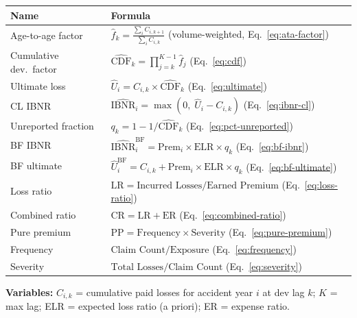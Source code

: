 \begin{tabularx}{\textwidth}{lX}
\toprule
\textbf{Name} & \textbf{Formula} \\
\midrule
Age-to-age factor &
$\displaystyle \hat{f}_k = \frac{\sum_{i} C_{i,k+1}}{\sum_{i} C_{i,k}}$
\quad (volume-weighted, Eq.~\ref{eq:ata-factor}) \\[12pt]

Cumulative dev.\ factor &
$\displaystyle \widehat{\text{CDF}}_k = \prod_{j=k}^{K-1} \hat{f}_j$
\quad (Eq.~\ref{eq:cdf}) \\[12pt]

Ultimate loss &
$\hat{U}_i = C_{i,k} \times \widehat{\text{CDF}}_k$
\quad (Eq.~\ref{eq:ultimate}) \\[8pt]

CL IBNR &
$\widehat{\text{IBNR}}_i = \max(0,\; \hat{U}_i - C_{i,k})$
\quad (Eq.~\ref{eq:ibnr-cl}) \\[8pt]

Unreported fraction &
$q_k = 1 - 1/\widehat{\text{CDF}}_k$
\quad (Eq.~\ref{eq:pct-unreported}) \\[8pt]

BF IBNR &
$\widehat{\text{IBNR}}_i^{\text{BF}} = \text{Prem}_i \times \text{ELR} \times q_k$
\quad (Eq.~\ref{eq:bf-ibnr}) \\[8pt]

BF ultimate &
$\hat{U}_i^{\text{BF}} = C_{i,k} + \text{Prem}_i \times \text{ELR} \times q_k$
\quad (Eq.~\ref{eq:bf-ultimate}) \\[8pt]

Loss ratio &
$\text{LR} = \text{Incurred Losses} / \text{Earned Premium}$
\quad (Eq.~\ref{eq:loss-ratio}) \\[8pt]

Combined ratio &
$\text{CR} = \text{LR} + \text{ER}$
\quad (Eq.~\ref{eq:combined-ratio}) \\[8pt]

Pure premium &
$\text{PP} = \text{Frequency} \times \text{Severity}$
\quad (Eq.~\ref{eq:pure-premium}) \\[8pt]

Frequency &
$\text{Claim Count} / \text{Exposure}$
\quad (Eq.~\ref{eq:frequency}) \\[8pt]

Severity &
$\text{Total Losses} / \text{Claim Count}$
\quad (Eq.~\ref{eq:severity}) \\
\bottomrule
\end{tabularx}

\medskip
\noindent\textbf{Variables:} $C_{i,k}$ = cumulative paid losses for accident year $i$ at dev lag $k$; $K$ = max lag; ELR = expected loss ratio (a priori); ER = expense ratio.

